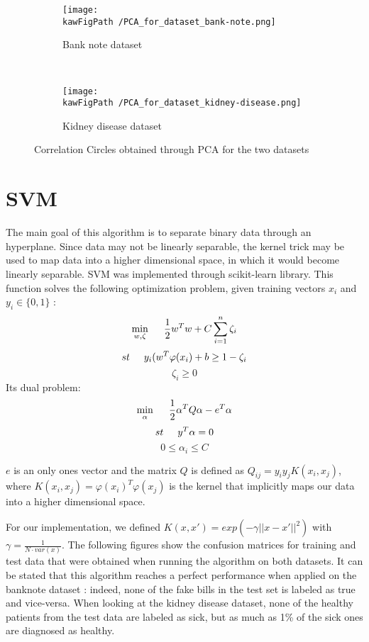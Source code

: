 \documentclass[11pt,a4paper]{article}
\def \kawFigPath {Output/Images}
\begin{document}
\begin{figure}[ht]
    \centering
    \begin{subfigure}[b]{0.45\textwidth} %
        \centering \texttt{[image: \\kawFigPath /PCA\_for\_dataset\_bank-note.png]}
        \caption{Bank note dataset}\label{ligne_on}
    \end{subfigure}
    ~
    \begin{subfigure}[b]{0.45\textwidth}
        \centering \texttt{[image: \\kawFigPath /PCA\_for\_dataset\_kidney-disease.png]}
        \caption{Kidney disease dataset}\label{ligne_off}
    \end{subfigure}
    \caption{Correlation Circles obtained through PCA for the two datasets}\label{PCA1}

\end{figure}

\section{SVM}
The main goal of this algorithm is to separate binary data through an hyperplane. Since data may not be linearly separable, the kernel trick may be used to map data into a higher dimensional space, in which it would become linearly separable. SVM was implemented through scikit-learn library. This function solves the following optimization problem, given training vectors $x_i$ and $y_i \in \lbrace0,1\rbrace$ : 
   $$ \min\limits_{w, \zeta} \hspace{0.5cm} \frac{1}{2} w^Tw + C\sum_{i=1}^{n} \zeta_i$$
$$st \hspace{0.5cm} y_i(w^T\varphi(x_i)+b \geq 1- \zeta_i$$ 
   $$\zeta_i \geq 0$$
Its dual problem: 
   $$ \min\limits_{\alpha} \hspace{0.5cm} \frac{1}{2} \alpha^TQ\alpha -e^T\alpha$$
$$st \hspace{0.5cm} y^T\alpha=0$$ 
   $$0 \leq \alpha_i \leq C$$

$e$ is an only ones vector and the matrix $Q$ is defined as $Q_{ij}=y_iy_jK(x_i,x_j)$, where $K(x_i,x_j)=\varphi(x_i)^T\varphi(x_j)$ is the kernel that implicitly maps our data into a higher dimensional space. 

For our implementation, we defined $K(x,x')=exp(-\gamma ||x-x'||^2)$ with $\gamma=\frac{1}{N\cdot var(x)}$. 
The following figures show the confusion matrices for training and test data that were obtained when running the algorithm on both datasets. It can be stated that this algorithm reaches a perfect performance when applied on the banknote dataset : indeed, none of the fake bills in the test set is labeled as true and vice-versa. When looking at the kidney disease dataset, none of the healthy patients from the test data are labeled as sick, but as much as 1\% of the sick ones are diagnosed as healthy. 
\end{document}
